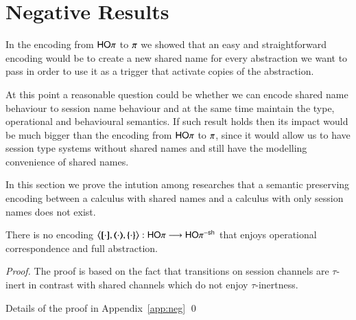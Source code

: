 \section{Negative Results}

In the encoding from $\mathsf{HO}\pi$ to $\pi$ we showed that
an easy and straightforward encoding would be to create
a new shared name for every abstraction we want to pass
in order to use it as a trigger that activate copies of
the abstraction.

At this point a reasonable question could be whether we can
encode shared name behaviour to session name behaviour and at
the same time maintain the type, operational and behavioural semantics.
If such result holds then its impact would be much bigger than
the encoding from $\mathsf{HO}\pi$ to $\pi$, since it would
allow us to have session type systems without shared names
and still have the modelling convenience of shared names.

In this section we prove the intution among researches 
that a semantic preserving encoding between a calculus
with shared names and a calculus with only session names
does not exist.

\begin{theorem}\rm
	There is no encoding $\enco{\map{\cdot}, \mapt{\cdot}, \mapa{\cdot}}: \HOp \longrightarrow \HOp^{\minussh}$
	that enjoys operational correspondence and full abstraction.
\end{theorem}

\begin{proof}
	The proof is based on the fact that
	transitions on session channels are
	$\tau$-inert in contrast with shared
	channels which do not enjoy
	$\tau$-inertness.

	Details of the proof in Appendix~\ref{app:neg}
	\qed
\end{proof}
